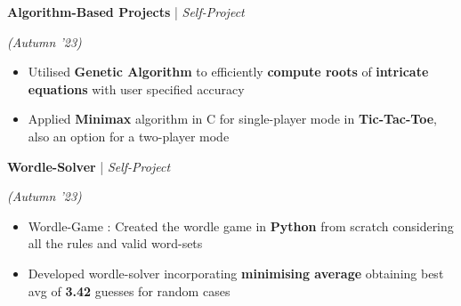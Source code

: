 \documentclass[10pt]{article}
\renewcommand{\subsection}[4]{
	\def\temp{#4}
	\vspace{2pt}
	{
		\large
		{\textbf{#1}} | {\sl #2} \filldate{#3}
		\ifx\temp\empty
		\else
		{
			\\[0.1em]
			\fontsize{11}{13.2}\selectfont
			\sl #4
		}
		\fi
	}
}
\newcommand{\filldate}[1]{\strut\hfill {\small \textit{(#1)}}}
\begin{document}
\subsection{Algorithm-Based Projects}{Self-Project}{Autumn '23}{}
\begin{itemize}
	\item Utilised \textbf{Genetic Algorithm} to efficiently \textbf{compute roots} of \textbf{intricate equations} with user specified accuracy
	\item Applied \textbf{Minimax} algorithm in C for single-player mode in \textbf{Tic-Tac-Toe}, also an option for a two-player mode

\end{itemize}

\subsection{Wordle-Solver}{Self-Project}{Autumn '23}{}
\begin{itemize}
	\item Wordle-Game : Created the wordle game in \textbf{Python} from scratch considering all the rules and valid word-sets
	\item Developed wordle-solver incorporating \textbf{minimising average} obtaining best avg of \textbf{3.42} guesses for random cases

\end{itemize}




\end{document}
